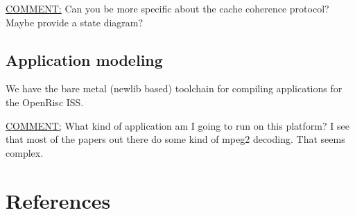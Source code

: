 \documentclass[12pt,twoside]{article}
\begin{document}
\uline{COMMENT:} Can you be more specific about the cache coherence protocol? Maybe provide a state diagram?


\subsection{Application modeling}
\label{sec-7-2}
We have the bare metal (newlib based) toolchain for compiling applications for the OpenRisc ISS.

\uline{COMMENT;} What kind of application am I going to run on this platform?
I see that most of the papers out there do some kind of mpeg2 decoding. That seems complex.

\clearpage




\section{References}
\label{sec-8}
\renewcommand\refname{}


\end{document}
